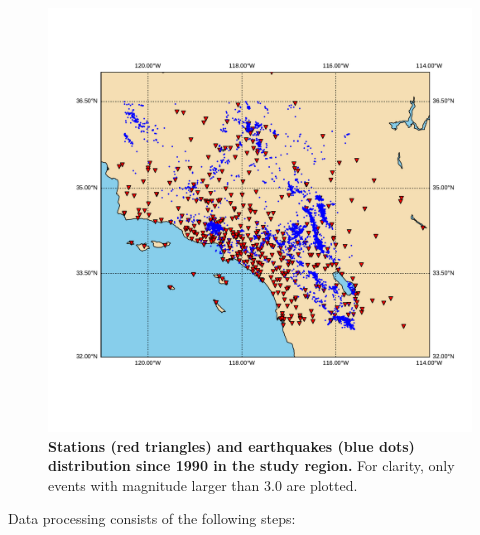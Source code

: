 \documentclass{article} %
\begin{document}

\begin{figure}[ht!]
	\centering
	\includegraphics*[scale=0.4, viewport= -40mm 40mm 500mm 230mm, angle=0]{./figure/stations_events.pdf}
	\caption{{\bf Stations (red triangles) and earthquakes (blue dots) distribution since 1990 in the study region.} For clarity, only events with magnitude larger than 3.0 are plotted.}
	\label{stations_events} %
\end{figure}

Data processing consists of the following steps:
\end{document}
